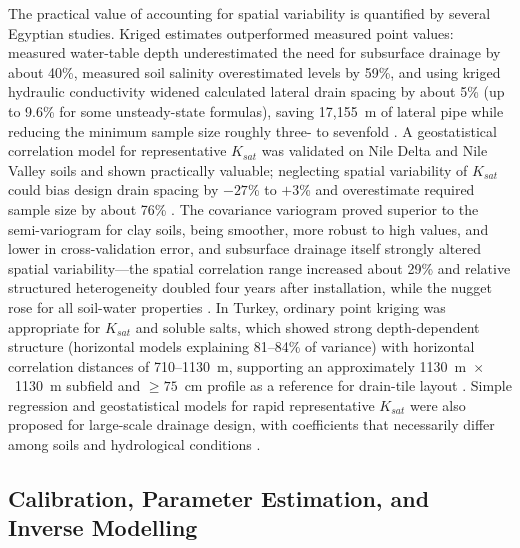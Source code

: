 \documentclass[11pt]{article}
\begin{document}
The practical value of accounting for spatial variability is quantified by
several Egyptian studies. Kriged estimates outperformed measured point values:
measured water-table depth underestimated the need for subsurface drainage by
about 40\%, measured soil salinity overestimated levels by 59\%, and using
kriged hydraulic conductivity widened calculated lateral drain spacing by about
5\% (up to 9.6\% for some unsteady-state formulas), saving 17{,}155~m of lateral
pipe while reducing the minimum sample size roughly three- to sevenfold
\parencite{Moustafa1998b}. A geostatistical correlation model for representative
$K_{sat}$ was validated on Nile Delta and Nile Valley soils and shown practically
valuable; neglecting spatial variability of $K_{sat}$ could bias design drain
spacing by $-27$\% to $+3$\% and overestimate required sample size by about 76\%
\parencite{Moustafa2000}. The covariance variogram proved superior to the
semi-variogram for clay soils, being smoother, more robust to high values, and
lower in cross-validation error, and subsurface drainage itself strongly altered
spatial variability---the spatial correlation range increased about 29\% and
relative structured heterogeneity doubled four years after installation, while
the nugget rose for all soil-water properties \parencite{Moustafa1998}. In
Turkey, ordinary point kriging was appropriate for $K_{sat}$ and soluble salts,
which showed strong depth-dependent structure (horizontal models explaining
81--84\% of variance) with horizontal correlation distances of 710--1130~m,
supporting an approximately 1130~m~$\times$~1130~m subfield and $\geq75$~cm profile
as a reference for drain-tile layout \parencite{Akis2015}. Simple regression and
geostatistical models for rapid representative $K_{sat}$ were also proposed for
large-scale drainage design, with coefficients that necessarily differ among
soils and hydrological conditions \parencite{Sepaskhah2004}.

\subsection{Calibration, Parameter Estimation, and Inverse Modelling}
\end{document}
